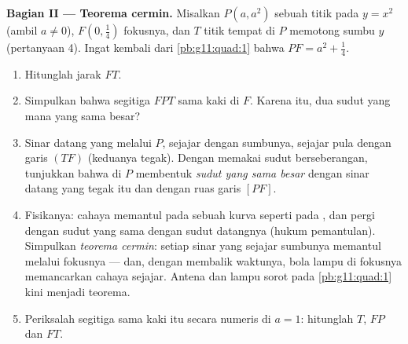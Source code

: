 \begin{problem}
\medskip
\noindent\textbf{Bagian II --- Teorema cermin.}
Misalkan $P(a, a^2)$ sebuah titik pada  $y = x^2$ (ambil
$a \neq 0$), $F\left(0, \frac14\right)$ fokusnya, dan $T$
titik tempat  di $P$ memotong sumbu $y$ (pertanyaan
4). Ingat kembali dari \cref{pb:g11:quad:1} bahwa
$PF = a^2 + \frac14$.
\begin{enumerate}[resume]
  \item Hitunglah jarak $FT$.
  \item Simpulkan bahwa segitiga $FPT$ sama kaki di $F$.
        Karena itu, dua sudut yang mana yang sama besar?
  \item Sinar datang yang melalui $P$, sejajar dengan sumbunya,
        sejajar pula dengan garis $(TF)$ (keduanya tegak). Dengan
        memakai sudut berseberangan, tunjukkan bahwa  di $P$
        membentuk \emph{sudut yang sama besar} dengan sinar datang yang tegak
        itu dan dengan ruas garis $[PF]$.
  \item Fisikanya: cahaya memantul pada sebuah kurva seperti pada , dan pergi dengan sudut yang sama dengan sudut datangnya
        (hukum pemantulan). Simpulkan \emph{teorema cermin}: setiap
        sinar yang sejajar sumbunya memantul melalui fokusnya ---
        dan, dengan membalik waktunya, bola lampu di fokusnya memancarkan
        cahaya sejajar. Antena  dan lampu sorot pada
        \cref{pb:g11:quad:1} kini menjadi teorema.
  \item Periksalah segitiga sama kaki itu secara numeris di $a = 1$:
        hitunglah $T$, $FP$ dan $FT$.
\end{enumerate}


\end{problem}
